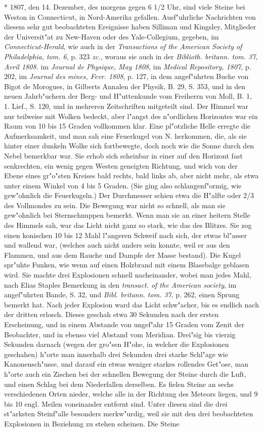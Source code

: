 \documentclass[a4paper, 11pt, oneside, polutonikogreek, german]{article}
\begin{document}
* 1807, den 14. Dezember, des morgens gegen 6 1/2 Uhr, sind viele Steine bei Weston in Connecticut, in Nord-Amerika gefallen. Ausf"uhrliche Nachrichten von diesem sehr gut beobachteten Ereignisse haben Silliman und Kingsley, Mitglieder der Universit"at zu New-Haven oder des Yale-Collegium, gegeben, im \emph{Connecticut-Herald}, wie auch in der \emph{Transactions of the American Society of Philadelphia, tom. 6}, p. 323 \emph{zc.}, woraus sie auch in der \emph{Biblioth. britann. tom. 37, Avril 1808.} im \emph{Journal de Physique, May 1808}, im \emph{Medical Repository, 1807}, p. 202, im \emph{Journal des mines, Fevr. 1808}, p. 127, in dem angef"uhrten Buche von Bigot de Morogues, in Gilberts Annalen der Physik, B. 29, S. 353, und in den neuen Jahrb"uchern der Berg- und H"uttenkunde vom Freiherrn von Moll, B. 1, 1. Lief., S. 120, und in mehreren Zeitschriften mitgeteilt sind. Der Himmel war nur teilweise mit Wolken bedeckt, aber l"angst des n"ordlichen Horizontes war ein Raum von 10 bis 15 Graden vollkommen klar. Eine pl"otzliche Helle erregte die Aufmerksamkeit, und man sah eine Feuerkugel von N. herkommen, die, als sie hinter einer dunkeln Wolke sich fortbewegte, doch noch wie die Sonne durch den Nebel bemerkbar war. Sie erhob sich scheinbar in einer auf den Horizont fast senkrechten, ein wenig gegen Westen geneigten Richtung, und wich von der Ebene eines gr"o"sten Kreises bald rechts, bald links ab, aber nicht mehr, als etwa unter einem Winkel von 4 bis 5 Graden. (Sie ging also schlangenf"ormig, wie gew"ohnlich die Feuerkugeln.) Der Durchmesser schien etwa die H"alfte oder 2/3 des Vollmondes zu sein. Die Bewegung war nicht so schnell, als man sie gew"ohnlich bei Sternschnuppen bemerkt. Wenn man sie an einer heitern Stelle des Himmels sah, war das Licht nicht ganz so stark, wie das des Blitzes. Sie zog einen konischen 10 bis 12 Mahl l"angeren Schweif nach sich, der etwas bl"asser und wallend war, (welches auch nicht anders sein konnte, weil er aus den Flammen, und aus dem Rauche und Dampfe der Masse bestand). Die Kugel spr"uhte Funken, wie wenn auf einen Holzbrand mit einem Blasebalge geblasen wird. Sie machte drei Explosionen schnell nacheinander, wobei man jedes Mahl, nach Elias Staples Bemerkung in den \emph{transact. of the American society}, im angef"uhrten Bande, S. 32, und \emph{Bibl. britann. tom. 37}, p. 262, einen Sprung bemerkt hat. Nach jeder Explosion ward das Licht schw"acher, bis es endlich nach der dritten erlosch. Dieses geschah etwa 30 Sekunden nach der ersten Erscheinung, und in einem Abstande von ungef"ahr 15 Graden vom Zenit der Beobachter, und in ebenso viel Abstand vom Meridian. Drei"sig bis vierzig Sekunden darnach (wegen der gro"sen H"ohe, in welcher die Explosionen geschahen) h"orte man innerhalb drei Sekunden drei starke Schl"age wie Kanonensch"usse, und darauf ein etwas weniger starkes rollendes Get"ose, man h"orte auch ein Zischen bei der schnellen Bewegung der Steine durch die Luft, und einen Schlag bei dem Niederfallen derselben. Es fielen Steine an sechs verschiedenen Orten nieder, welche alle in der Richtung des Meteors liegen, und 9 bis 10 engl. Meilen voneinander entfernt sind. Unter diesen sind die drei st"arksten Steinf"alle besonders merkw"urdig, weil sie mit den drei beobachteten Explosionen in Beziehung zu stehen scheinen. Die Steine 
\end{document}
